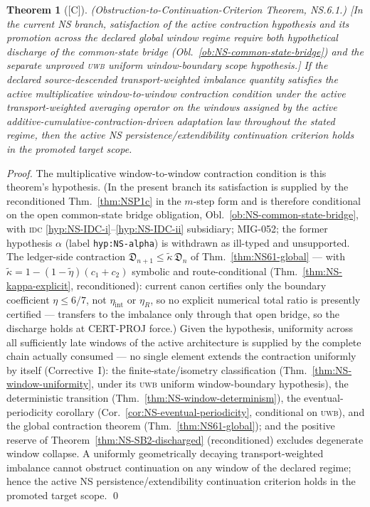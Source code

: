 \documentclass[12pt,oneside]{amsbook}
\theoremstyle{plain}
\newtheorem{theorem}{Theorem}[section]
\theoremstyle{definition}
\theoremstyle{remark}
\newcommand{\status}[1]{\textup{[#1]}}
\begin{document}
\begin{theorem}[\status{C}]\label{thm:NS61}
\textup{(Obstruction-to-Continuation-Criterion Theorem, NS.6.1.)}
\textup{[In the current NS branch, satisfaction of the active
contraction hypothesis and its promotion across the declared global
window regime require both hypothetical discharge of the common-state
bridge (Obl.~\ref{ob:NS-common-state-bridge}) and the separate
unproved \textsc{uwb} uniform window-boundary scope hypothesis.]}
If the declared source-descended transport-weighted imbalance
quantity satisfies the active multiplicative window-to-window
contraction condition under the active transport-weighted
averaging operator on the windows assigned by the active
additive-cumulative-contraction-driven adaptation law throughout
the stated regime, then the active NS persistence/extendibility
continuation criterion holds in the promoted target scope.
\end{theorem}
\begin{proof}
The multiplicative window-to-window contraction condition is this
theorem's hypothesis. (In the present branch its satisfaction is
supplied by the reconditioned Thm.~\ref{thm:NSP1c} in the $m$-step
form and is therefore conditional on the open common-state bridge
obligation, Obl.~\ref{ob:NS-common-state-bridge}, with \textsc{idc}
\eqref{hyp:NS-IDC-i}--\eqref{hyp:NS-IDC-ii} subsidiary; MIG-052;
the former hypothesis $\alpha$ (label \texttt{hyp:NS-alpha}) is
withdrawn as ill-typed and unsupported.
The ledger-side contraction
$\mathfrak{D}_{n+1}\leq\widetilde\kappa\,\mathfrak{D}_n$ of
Thm.~\ref{thm:NS61-global} --- with
$\widetilde\kappa = 1-(1-\widetilde\eta)(c_1+c_2)$ symbolic and
route-conditional (Thm.~\ref{thm:NS-kappa-explicit},
reconditioned): current canon certifies only the boundary
coefficient $\eta \leq 6/7$, not $\eta_{\mathrm{int}}$ or
$\eta_R$, so no explicit numerical total ratio is presently
certified --- transfers to the imbalance only through that open
bridge, so the discharge holds at CERT-PROJ force.) Given the
hypothesis, uniformity across all sufficiently late windows of the
active architecture is supplied by the complete chain actually
consumed --- no single element extends the contraction uniformly by
itself (Corrective~I): the finite-state/isometry classification
(Thm.~\ref{thm:NS-window-uniformity}, under its \textsc{uwb}
uniform window-boundary hypothesis), the deterministic transition
(Thm.~\ref{thm:NS-window-determinism}), the eventual-periodicity
corollary (Cor.~\ref{cor:NS-eventual-periodicity}, conditional on
\textsc{uwb}), and the global contraction theorem
(Thm.~\ref{thm:NS61-global}); and the positive reserve of
Theorem~\ref{thm:NS-SB2-discharged} (reconditioned) excludes
degenerate window collapse. A uniformly geometrically decaying
transport-weighted imbalance cannot obstruct continuation on any
window of the declared regime; hence the active NS
persistence/extendibility continuation criterion holds in the
promoted target scope. \qed
\end{proof}
\end{document}
